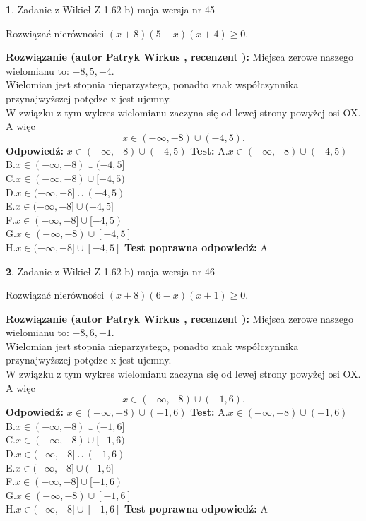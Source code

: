 \documentclass[12pt, a4paper]{article}
\theoremstyle{definition} %
\newtheorem{zad}{}
\newcommand{\zadStart}[1]{\begin{zad}#1\newline}
\newcommand{\zadStop}{\end{zad}}
\newcommand{\rozwStart}[2]{\noindent \textbf{Rozwiązanie (autor #1 , recenzent #2): }\newline}
\newcommand{\rozwStop}{\newline}
\newcommand{\odpStart}{\noindent \textbf{Odpowiedź:}\newline}
\newcommand{\odpStop}{\newline}
\newcommand{\testStart}{\noindent \textbf{Test:}\newline}
\newcommand{\testStop}{\newline}
\newcommand{\kluczStart}{\noindent \textbf{Test poprawna odpowiedź:}\newline}
\newcommand{\kluczStop}{\newline}
\begin{document}
\zadStart{Zadanie z Wikieł Z 1.62 b) moja wersja nr 45}

Rozwiązać nierówności $(x+8)(5-x)(x+4)\ge0$.
\zadStop
\rozwStart{Patryk Wirkus}{}
Miejsca zerowe naszego wielomianu to: $-8, 5, -4$.\\
Wielomian jest stopnia nieparzystego, ponadto znak współczynnika przy\linebreak najwyższej potędze x jest ujemny.\\ W związku z tym wykres wielomianu zaczyna się od lewej strony powyżej osi OX. A więc $$x \in (-\infty,-8) \cup (-4,5).$$
\rozwStop
\odpStart
$x \in (-\infty,-8) \cup (-4,5)$
\odpStop
\testStart
A.$x \in (-\infty,-8) \cup (-4,5)$\\
B.$x \in (-\infty,-8) \cup (-4,5]$\\
C.$x \in (-\infty,-8) \cup [-4,5)$\\
D.$x \in (-\infty,-8] \cup (-4,5)$\\
E.$x \in (-\infty,-8] \cup (-4,5]$\\
F.$x \in (-\infty,-8] \cup [-4,5)$\\
G.$x \in (-\infty,-8) \cup [-4,5]$\\
H.$x \in (-\infty,-8] \cup [-4,5]$
\testStop
\kluczStart
A
\kluczStop



\zadStart{Zadanie z Wikieł Z 1.62 b) moja wersja nr 46}

Rozwiązać nierówności $(x+8)(6-x)(x+1)\ge0$.
\zadStop
\rozwStart{Patryk Wirkus}{}
Miejsca zerowe naszego wielomianu to: $-8, 6, -1$.\\
Wielomian jest stopnia nieparzystego, ponadto znak współczynnika przy\linebreak najwyższej potędze x jest ujemny.\\ W związku z tym wykres wielomianu zaczyna się od lewej strony powyżej osi OX. A więc $$x \in (-\infty,-8) \cup (-1,6).$$
\rozwStop
\odpStart
$x \in (-\infty,-8) \cup (-1,6)$
\odpStop
\testStart
A.$x \in (-\infty,-8) \cup (-1,6)$\\
B.$x \in (-\infty,-8) \cup (-1,6]$\\
C.$x \in (-\infty,-8) \cup [-1,6)$\\
D.$x \in (-\infty,-8] \cup (-1,6)$\\
E.$x \in (-\infty,-8] \cup (-1,6]$\\
F.$x \in (-\infty,-8] \cup [-1,6)$\\
G.$x \in (-\infty,-8) \cup [-1,6]$\\
H.$x \in (-\infty,-8] \cup [-1,6]$
\testStop
\kluczStart
A
\kluczStop
\end{document}
